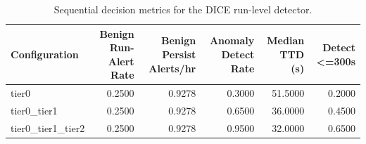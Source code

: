 \begin{table}[t]
\centering
\caption{Sequential decision metrics for the DICE run-level detector.}
\label{tab:dice_sequential_metrics}
\footnotesize
\begin{tabular}{lrrrrr}
\toprule
Configuration & Benign Run-Alert Rate & Benign Persist Alerts/hr & Anomaly Detect Rate & Median TTD (s) & Detect <=300s \\
\midrule
tier0 & 0.2500 & 0.9278 & 0.3000 & 51.5000 & 0.2000 \\
tier0_tier1 & 0.2500 & 0.9278 & 0.6500 & 36.0000 & 0.4500 \\
tier0_tier1_tier2 & 0.2500 & 0.9278 & 0.9500 & 32.0000 & 0.6500 \\
\bottomrule
\end{tabular}

\end{table}
